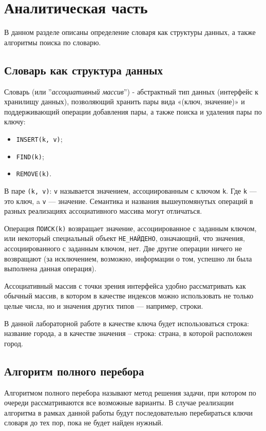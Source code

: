 \chapter{Аналитическая часть}
В данном разделе описаны определение словаря как структуры данных, а также алгоритмы поиска по словарю.

\section{Словарь как структура данных}

Словарь (или ''\textit{ассоциативный массив}'') \cite{dict} - абстрактный тип данных (интерфейс к хранилищу данных), позволяющий хранить пары вида «(ключ, значение)» и поддерживающий операции добавления пары, а также поиска и удаления пары по ключу:
\begin{itemize}
	\item \texttt{INSERT(k, v)};
	\item \texttt{FIND(k)};
	\item \texttt{REMOVE(k)}.
\end{itemize}

В паре \texttt{(k, v)}: \texttt{v} называется значением, ассоциированным с ключом \texttt{k}. Где \texttt{k} — это ключ, a \texttt{v} — значение. Семантика и названия вышеупомянутых операций в разных реализациях ассоциативного массива могут отличаться.

Операция \texttt{ПОИСК(k)} возвращает значение, ассоциированное с заданным ключом, или некоторый специальный объект \texttt{НЕ\_НАЙДЕНО}, означающий, что значения, ассоциированного с заданным ключом, нет. Две другие операции ничего не возвращают (за исключением, возможно, информации о том, успешно ли была выполнена данная операция).

Ассоциативный массив с точки зрения интерфейса удобно рассматривать как обычный массив, в котором в качестве индексов можно использовать не только целые числа, но и значения других типов — например, строки.

В данной лабораторной работе в качестве ключа будет использоваться строка: название города, а в качестве значения -- строка: страна, в которой расположен город.

\section{Алгоритм полного перебора}
Алгоритмом полного перебора \cite{AI} называют метод решения задачи, при котором по очереди рассматриваются все возможные варианты. В случае реализации алгоритма в рамках данной работы будут последовательно перебираться ключи словаря до тех пор, пока не будет найден нужный. 

